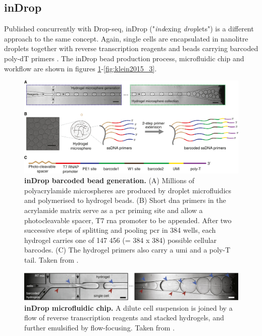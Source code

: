 \subsection{inDrop}
\label{subsect:lit_indrop}
Published concurrently with Drop-seq, inDrop ("\textit{ind}exing \textit{drop}lets") is a different approach to the same concept. Again, single cells are encapsulated in nanolitre droplets together with reverse transcription reagents and beads carrying barcoded poly-dT primers \citep{klein2015, zilionis2017}. The inDrop bead production process, microfluidic chip and workflow are shown in figures \ref{fig:klein2015_1}-\ref{fig:klein2015_3}.\pms

\begin{figure}[ht]
	\centerfloat
	\includegraphics[width=\textwidth]{./ims/klein2015_1.png}
	\caption[inDrop barcoded bead generation]{\textbf{inDrop barcoded bead generation.} (A) Millions of polyacrylamide microspheres are produced by droplet microfluidics and polymerised to hydrogel beads. (B) Short \acrshort{dna} primers in the acrylamide matrix serve as a \acrshort{pcr} priming site and allow a photocleavable spacer, T7 \acrshort{rna} promoter to be appended. After two successive steps of splitting and pooling \acrshort{pcr} in 384 wells, each hydrogel carries one of 147 456 (= 384 x 384) possible cellular barcodes. (C) The hydrogel primers also carry a \acrshort{umi} and a poly-T tail. Taken from \cite{klein2015}.}
	\label{fig:klein2015_1}
\end{figure}

\begin{figure}[ht]
	\centerfloat
	\includegraphics[width=\textwidth]{./ims/klein2015_2.png}
	\caption[inDrop microfluidic chip]{\textbf{inDrop microfluidic chip.} A dilute cell suspension is joined by a flow of reverse transcription reagents and stacked hydrogels, and further emulsified by flow-focusing. Taken from \cite{klein2015}.}
	\label{fig:klein2015_2}
\end{figure}

